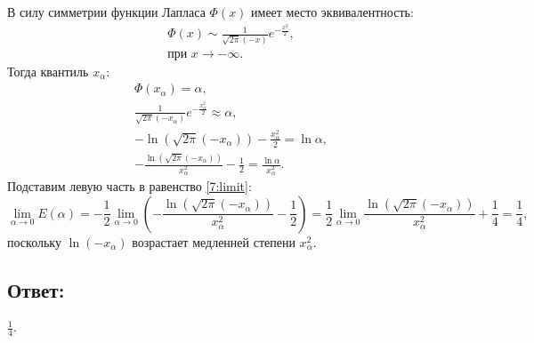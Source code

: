 \documentclass[12pt]{article}
\begin{document}
    В силу симметрии функции Лапласа $\Phi(x)$ имеет место эквивалентность:
    \begin{gather*}
        \Phi(x) \sim \frac{1}{\sqrt{2 \pi} (-x)} e^{- \frac{x^2}{2}}, \\
        \text{при } x \rightarrow - \infty .
    \end{gather*}
    Тогда квантиль $x_\alpha$:
    \begin{gather*}
        \Phi \left ( x_\alpha \right ) = \alpha, \\
        \frac{1}{\sqrt{2 \pi} (-x_\alpha)} e^{- \frac{x_\alpha^2}{2}} \approx \alpha, \\
        - \ln \left ( \sqrt{2 \pi} (-x_\alpha) \right ) - \frac{x_\alpha^2}{2} = \ln \alpha, \\
        - \frac{\ln \left ( \sqrt{2 \pi} (-x_\alpha) \right )}{x_\alpha^2} - \frac{1}{2} = \frac{\ln \alpha}{x_\alpha^2} .
    \end{gather*}
    Подставим левую часть в равенство \eqref{7:limit}:
    \[
        \lim \limits_{\alpha \rightarrow 0} E(\alpha)
        = - \frac{1}{2} \lim \limits_{\alpha \rightarrow 0} \left ( - \frac{\ln \left ( \sqrt{2 \pi} (-x_\alpha) \right )}{x_\alpha^2} - \frac{1}{2} \right )
        = \frac{1}{2} \lim \limits_{\alpha \rightarrow 0} \frac{\ln \left ( \sqrt{2 \pi} (-x_\alpha) \right )}{x_\alpha^2} + \frac{1}{4}
        = \frac{1}{4} ,
    \]
    поскольку $\ln(-x_\alpha)$ возрастает медленней степени $x_\alpha^2$.

    \subsection*{Ответ:}
    $\frac{1}{4}$.
\end{document}
